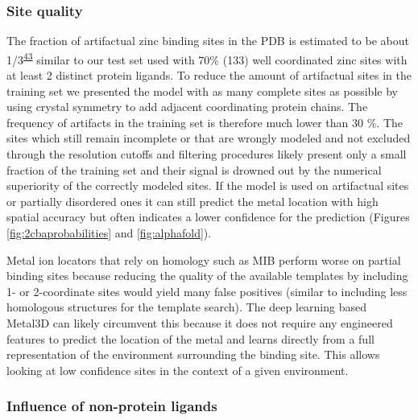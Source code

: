 \documentclass[ lineno,
  9pt]{elife}
\begin{document}
\hypertarget{site-quality}{%
\subsubsection{Site quality}\label{site-quality}}

The fraction of artifactual zinc binding sites in the PDB is estimated to be about 1/3\textsuperscript{\protect\hyperlink{ref-Wt0ducot}{43}} similar to our test set used with 70\% (133) well coordinated zinc sites with at least 2 distinct protein ligands. To reduce the amount of artifactual sites in the training set we presented the model with as many complete sites as possible by using crystal symmetry to add adjacent coordinating protein chains. The frequency of artifacts in the training set is therefore much lower than 30 \%. The sites which still remain incomplete or that are wrongly modeled and not excluded through the resolution cutoffs and filtering procedures likely present only a small fraction of the training set and their signal is drowned out by the numerical superiority of the correctly modeled sites. If the model is used on artifactual sites or partially disordered ones it can still predict the metal location with high spatial accuracy but often indicates a lower confidence for the prediction (Figures \ref{fig:2cbaprobabilities} and \ref{fig:alphafold}).

Metal ion locators that rely on homology such as MIB perform worse on partial binding sites because reducing the quality of the available templates by including 1- or 2-coordinate sites would yield many false positives (similar to including less homologous structures for the template search). The deep learning based Metal3D can likely circumvent this because it does not require any engineered features to predict the location of the metal and learns directly from a full representation of the environment surrounding the binding site. This allows looking at low confidence sites in the context of a given environment.

\hypertarget{influence-of-non-protein-ligands}{%
\subsubsection{Influence of non-protein ligands}\label{influence-of-non-protein-ligands}}
\end{document}

